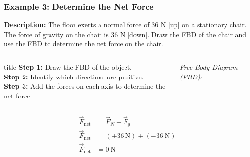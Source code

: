 \documentclass{beamer}
\begin{document}
\begin{frame}
\frametitle{Example 3: Determine the Net Force}

\textbf{Description:} The floor exerts a normal force of 36 N [up] on a stationary chair. The force of gravity on the chair is 36 N [down]. Draw the FBD of the chair and use the FBD to determine the net force on the chair. 

\vspace{0.3cm}

\begin{columns}
\centering

\begin{beamercolorbox}[rounded=true, shadow=true, wd=\textwidth, sep=0.8em]{title}
\textbf{Step 1:} Draw the FBD of the object. \\
\textbf{Step 2:} Identify which directions are positive. \\
\textbf{Step 3:} Add the forces on each axis to determine the net force. 
\end{beamercolorbox}

\vspace{0.4cm}
\centering
\pause
\textit{Free-Body Diagram (FBD):}\\[0.2cm]
\end{columns}

\pause
\centering
\[
\begin{aligned}
\vec{F}_{\text{net}} &= \vec{F}_N + \vec{F}_g \\
\vec{F}_{\text{net}} &= (+36~\text{N}) + (-36~\text{N}) \\
\vec{F}_{\text{net}} &= 0~\text{N}
\end{aligned}
\]


\end{frame}
\end{document}
